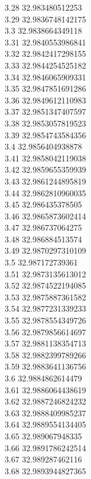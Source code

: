 {3.28	32.983480512253\\
3.29	32.9836748142175\\
3.3	32.9838664349118\\
3.31	32.9840553986841\\
3.32	32.9842417298155\\
3.33	32.9844254525182\\
3.34	32.9846065909331\\
3.35	32.9847851691286\\
3.36	32.9849612110983\\
3.37	32.9851347407597\\
3.38	32.9853057819523\\
3.39	32.9854743584356\\
3.4	32.9856404938878\\
3.41	32.9858042119038\\
3.42	32.9859655359939\\
3.43	32.9861244895819\\
3.44	32.9862810960035\\
3.45	32.986435378505\\
3.46	32.9865873602414\\
3.47	32.986737064275\\
3.48	32.986884513574\\
3.49	32.9870297310109\\
3.5	32.987172739361\\
3.51	32.9873135613012\\
3.52	32.9874522194085\\
3.53	32.9875887361582\\
3.54	32.9877231339233\\
3.55	32.9878554349726\\
3.56	32.9879856614697\\
3.57	32.9881138354713\\
3.58	32.9882399789266\\
3.59	32.9883641136756\\
3.6	32.9884862614479\\
3.61	32.9886064438619\\
3.62	32.9887246824232\\
3.63	32.9888409985237\\
3.64	32.9889554134405\\
3.65	32.989067948335\\
3.66	32.9891786242514\\
3.67	32.989287462116\\
3.68	32.9893944827365\\
}

